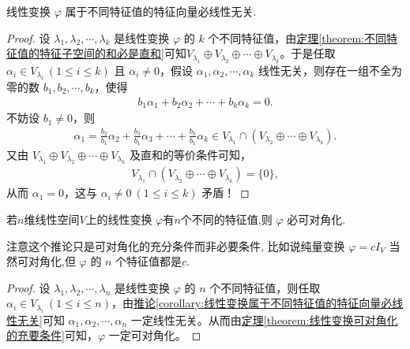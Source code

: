 \documentclass[../../main.tex]{subfiles}%
\begin{document}
\begin{corollary}\label{corollary:线性变换属于不同特征值的特征向量必线性无关}
线性变换 $\varphi$ 属于不同特征值的特征向量必线性无关.
\end{corollary}
\begin{proof}
设 $\lambda_1, \lambda_2, \cdots, \lambda_k$ 是线性变换 $\varphi$ 的 $k$ 个不同特征值，由\hyperref[theorem:不同特征值的特征子空间的和必是直和]{定理\ref{theorem:不同特征值的特征子空间的和必是直和}}可知$V_{\lambda_1} \oplus V_{\lambda_2} \oplus \cdots \oplus V_{\lambda_k}$。于是任取 $\alpha_i \in V_{\lambda_i} \ (1 \leqslant i \leqslant k)$ 且 $\alpha_i \ne 0$，假设 $\alpha_1, \alpha_2, \cdots, \alpha_k$ 线性无关，则存在一组不全为零的数 $b_1, b_2, \cdots, b_k$，使得
\begin{align*}
b_1 \alpha_1 + b_2 \alpha_2 + \cdots + b_k \alpha_k = 0.
\end{align*}
不妨设 $b_1 \ne 0$，则
\begin{align*}
\alpha_1 = \frac{b_2}{b_1} \alpha_2 + \frac{b_3}{b_1} \alpha_3 + \cdots + \frac{b_k}{b_1} \alpha_k \in V_{\lambda_1} \cap \left( V_{\lambda_2} \oplus \cdots \oplus V_{\lambda_k} \right).
\end{align*}
又由 $V_{\lambda_1} \oplus V_{\lambda_2} \oplus \cdots \oplus V_{\lambda_k}$ 及直和的等价条件可知，
\begin{align*}
V_{\lambda_1} \cap \left( V_{\lambda_2} \oplus \cdots \oplus V_{\lambda_k} \right) = \{ 0 \},
\end{align*}
从而 $\alpha_1 = 0$，这与 $\alpha_i \ne 0 \ (1 \leqslant i \leqslant k)$ 矛盾！
\end{proof}

\begin{corollary}
若$n$维线性空间$V$上的线性变换 $\varphi$有$n$个不同的特征值,则 $\varphi$ 必可对角化.
\end{corollary}
\begin{note}
注意这个推论只是可对角化的充分条件而非必要条件, 比如说纯量变换 $\varphi = cI_V$ 当然可对角化,但 $\varphi$ 的 $n$ 个特征值都是$c$.
\end{note}
\begin{proof}
设 $\lambda_1, \lambda_2, \cdots, \lambda_n$ 是线性变换 $\varphi$ 的 $n$ 个不同特征值，则任取 $\alpha_i \in V_{\lambda_i} \ (1 \leqslant i \leqslant n)$，由\hyperref[corollary:线性变换属于不同特征值的特征向量必线性无关]{推论\ref{corollary:线性变换属于不同特征值的特征向量必线性无关}}可知 $\alpha_1, \alpha_2, \cdots, \alpha_n$ 一定线性无关。从而由\hyperref[theorem:线性变换可对角化的充要条件]{定理\ref{theorem:线性变换可对角化的充要条件}}可知，$\varphi$ 一定可对角化。
\end{proof}
\end{document}
